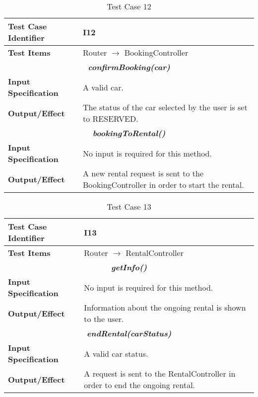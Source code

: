 \begin{table}[h]
	\begin{tabularx}{\textwidth}{l X}
		\hline
		\textbf{Test Case Identifier}	&	I12\\	\hline
		\textbf{Test Items}			&	Router $\rightarrow$ BookingController \\	\hline\hline
		\multicolumn{2}{c}{\textbf{\textit{confirmBooking(car)}}}	\\	\hline
			\textbf{Input Specification}	&	A valid car.\\	\hline
			\textbf{Output/Effect}	&	The status of the car selected by the user is set to RESERVED.\\	\hline\hline
		\multicolumn{2}{c}{\textbf{\textit{bookingToRental()}}}	\\	\hline
			\textbf{Input Specification}	&	No input is required for this method.\\	\hline
			\textbf{Output/Effect}	&	A new rental request is sent to the BookingController in order to start the rental.\\	\hline\hline
	\end{tabularx}
	\captionsetup{textformat=empty,labelformat=blank}
	\caption{Test Case 12}
	\label{table:template-table-12}
\end{table}

\begin{table}[h]
	\begin{tabularx}{\textwidth}{l X}
		\hline
		\textbf{Test Case Identifier}	&	I13\\	\hline
		\textbf{Test Items}			&	Router $\rightarrow$ RentalController \\	\hline\hline
		\multicolumn{2}{c}{\textbf{\textit{getInfo()}}}	\\	\hline
			\textbf{Input Specification}	&	No input is required for this method.\\	\hline
			\textbf{Output/Effect}	&	Information about the ongoing rental is shown to the user.\\	\hline\hline
		\multicolumn{2}{c}{\textbf{\textit{endRental(carStatus)}}}	\\	\hline
			\textbf{Input Specification}	&	A valid car status.\\	\hline
			\textbf{Output/Effect}	&	A request is sent to the RentalController in order to end the ongoing rental.\\	\hline\hline
	\end{tabularx}
	\captionsetup{textformat=empty,labelformat=blank}
	\caption{Test Case 13}
	\label{table:template-table-13}
\end{table}

